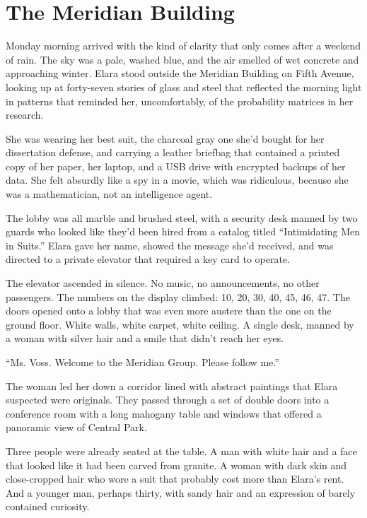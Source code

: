 \documentclass[
    language=english,
    doctype=novel,
    institution=none,
]{../../omnilatex}
\begin{document}
\chapter{The Meridian Building}

Monday morning arrived with the kind of clarity that only comes after a weekend of rain. The sky was a pale, washed blue, and the air smelled of wet concrete and approaching winter. Elara stood outside the Meridian Building on Fifth Avenue, looking up at forty-seven stories of glass and steel that reflected the morning light in patterns that reminded her, uncomfortably, of the probability matrices in her research.

She was wearing her best suit, the charcoal gray one she'd bought for her dissertation defense, and carrying a leather briefbag that contained a printed copy of her paper, her laptop, and a USB drive with encrypted backups of her data. She felt absurdly like a spy in a movie, which was ridiculous, because she was a mathematician, not an intelligence agent.

The lobby was all marble and brushed steel, with a security desk manned by two guards who looked like they'd been hired from a catalog titled ``Intimidating Men in Suits.'' Elara gave her name, showed the message she'd received, and was directed to a private elevator that required a key card to operate.

The elevator ascended in silence. No music, no announcements, no other passengers. The numbers on the display climbed: 10, 20, 30, 40, 45, 46, 47. The doors opened onto a lobby that was even more austere than the one on the ground floor. White walls, white carpet, white ceiling. A single desk, manned by a woman with silver hair and a smile that didn't reach her eyes.

``Ms. Voss. Welcome to the Meridian Group. Please follow me.''

The woman led her down a corridor lined with abstract paintings that Elara suspected were originals. They passed through a set of double doors into a conference room with a long mahogany table and windows that offered a panoramic view of Central Park.

Three people were already seated at the table. A man with white hair and a face that looked like it had been carved from granite. A woman with dark skin and close-cropped hair who wore a suit that probably cost more than Elara's rent. And a younger man, perhaps thirty, with sandy hair and an expression of barely contained curiosity.
\end{document}
